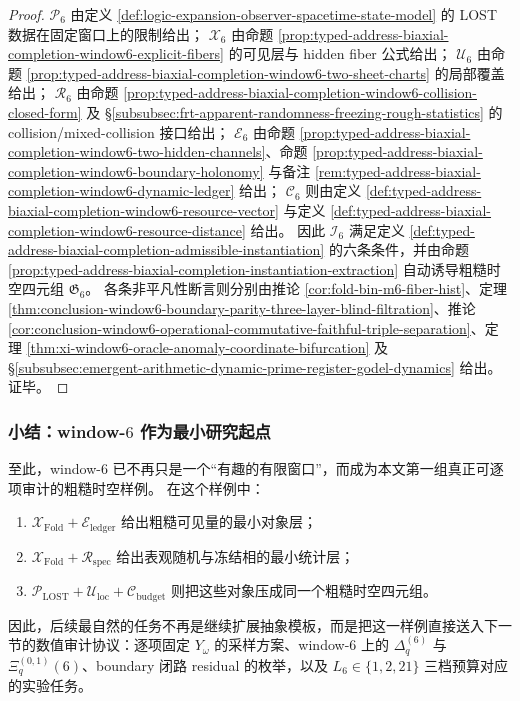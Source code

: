 \begin{proof}
\(\mathcal P_6\) 由定义 \ref{def:logic-expansion-observer-spacetime-state-model} 的 LOST 数据在固定窗口上的限制给出；
\(\mathcal X_6\) 由命题 \ref{prop:typed-address-biaxial-completion-window6-explicit-fibers} 的可见层与 hidden fiber 公式给出；
\(\mathcal U_6\) 由命题 \ref{prop:typed-address-biaxial-completion-window6-two-sheet-charts} 的局部覆盖给出；
\(\mathcal R_6\) 由命题 \ref{prop:typed-address-biaxial-completion-window6-collision-closed-form} 及 \S\ref{subsubsec:frt-apparent-randomness-freezing-rough-statistics} 的 collision/mixed-collision 接口给出；
\(\mathcal E_6\) 由命题 \ref{prop:typed-address-biaxial-completion-window6-two-hidden-channels}、命题 \ref{prop:typed-address-biaxial-completion-window6-boundary-holonomy} 与备注 \ref{rem:typed-address-biaxial-completion-window6-dynamic-ledger} 给出；
\(\mathcal C_6\) 则由定义 \ref{def:typed-address-biaxial-completion-window6-resource-vector} 与定义 \ref{def:typed-address-biaxial-completion-window6-resource-distance} 给出。
因此 \(\mathcal I_6\) 满足定义 \ref{def:typed-address-biaxial-completion-admissible-instantiation} 的六条条件，并由命题 \ref{prop:typed-address-biaxial-completion-instantiation-extraction} 自动诱导粗糙时空四元组 \(\mathfrak G_6\)。
各条非平凡性断言则分别由推论 \ref{cor:fold-bin-m6-fiber-hist}、定理 \ref{thm:conclusion-window6-boundary-parity-three-layer-blind-filtration}、推论 \ref{cor:conclusion-window6-operational-commutative-faithful-triple-separation}、定理 \ref{thm:xi-window6-oracle-anomaly-coordinate-bifurcation} 及 \S\ref{subsubsec:emergent-arithmetic-dynamic-prime-register-godel-dynamics} 给出。证毕。
\end{proof}

\subsubsection{小结：window-\texorpdfstring{$6$}{6} 作为最小研究起点}\label{subsubsec:typed-address-biaxial-completion-window6-example-summary}
至此，window-\(6\) 已不再只是一个“有趣的有限窗口”，而成为本文第一组真正可逐项审计的粗糙时空样例。
在这个样例中：
\begin{enumerate}
  \item \(\mathcal X_{\mathrm{Fold}}+\mathcal E_{\mathrm{ledger}}\) 给出粗糙可见量的最小对象层；
  \item \(\mathcal X_{\mathrm{Fold}}+\mathcal R_{\mathrm{spec}}\) 给出表观随机与冻结相的最小统计层；
  \item \(\mathcal P_{\mathrm{LOST}}+\mathcal U_{\mathrm{loc}}+\mathcal C_{\mathrm{budget}}\) 则把这些对象压成同一个粗糙时空四元组。
\end{enumerate}
因此，后续最自然的任务不再是继续扩展抽象模板，而是把这一样例直接送入下一节的数值审计协议：逐项固定 \(Y_\omega\) 的采样方案、window-\(6\) 上的 \(\Delta_q^{(6)}\) 与 \(\Xi_q^{(0,1)}(6)\)、boundary 闭路 residual 的枚举，以及 \(L_6\in\{1,2,21\}\) 三档预算对应的实验任务。
